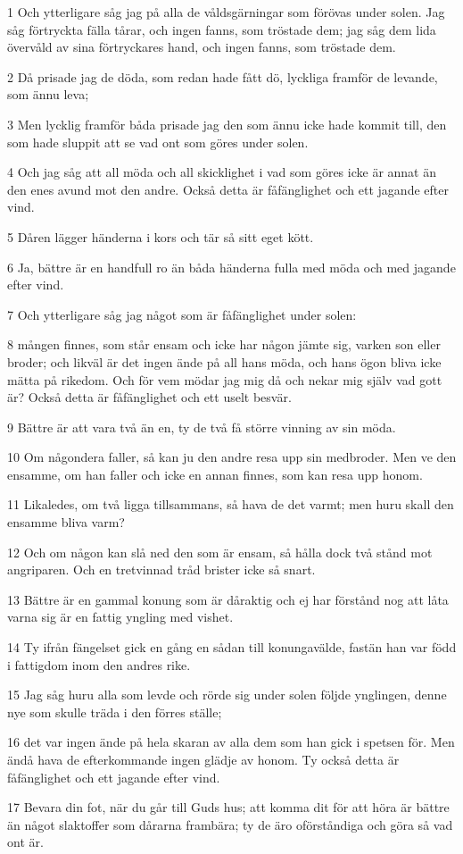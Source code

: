 \par 1 Och ytterligare såg jag på alla de våldsgärningar som förövas under solen. Jag såg förtryckta fälla tårar, och ingen fanns, som tröstade dem; jag såg dem lida övervåld av sina förtryckares hand, och ingen fanns, som tröstade dem.
\par 2 Då prisade jag de döda, som redan hade fått dö, lyckliga framför de levande, som ännu leva;
\par 3 Men lycklig framför båda prisade jag den som ännu icke hade kommit till, den som hade sluppit att se vad ont som göres under solen.
\par 4 Och jag såg att all möda och all skicklighet i vad som göres icke är annat än den enes avund mot den andre. Också detta är fåfänglighet och ett jagande efter vind.
\par 5 Dåren lägger händerna i kors och tär så sitt eget kött.
\par 6 Ja, bättre är en handfull ro än båda händerna fulla med möda och med jagande efter vind.
\par 7 Och ytterligare såg jag något som är fåfänglighet under solen:
\par 8 mången finnes, som står ensam och icke har någon jämte sig, varken son eller broder; och likväl är det ingen ände på all hans möda, och hans ögon bliva icke mätta på rikedom. Och för vem mödar jag mig då och nekar mig själv vad gott är? Också detta är fåfänglighet och ett uselt besvär.
\par 9 Bättre är att vara två än en, ty de två få större vinning av sin möda.
\par 10 Om någondera faller, så kan ju den andre resa upp sin medbroder. Men ve den ensamme, om han faller och icke en annan finnes, som kan resa upp honom.
\par 11 Likaledes, om två ligga tillsammans, så hava de det varmt; men huru skall den ensamme bliva varm?
\par 12 Och om någon kan slå ned den som är ensam, så hålla dock två stånd mot angriparen. Och en tretvinnad tråd brister icke så snart.
\par 13 Bättre är en gammal konung som är dåraktig och ej har förstånd nog att låta varna sig är en fattig yngling med vishet.
\par 14 Ty ifrån fängelset gick en gång en sådan till konungavälde, fastän han var född i fattigdom inom den andres rike.
\par 15 Jag såg huru alla som levde och rörde sig under solen följde ynglingen, denne nye som skulle träda i den förres ställe;
\par 16 det var ingen ände på hela skaran av alla dem som han gick i spetsen för. Men ändå hava de efterkommande ingen glädje av honom. Ty också detta är fåfänglighet och ett jagande efter vind.
\par 17 Bevara din fot, när du går till Guds hus; att komma dit för att höra är bättre än något slaktoffer som dårarna frambära; ty de äro oförståndiga och göra så vad ont är.

